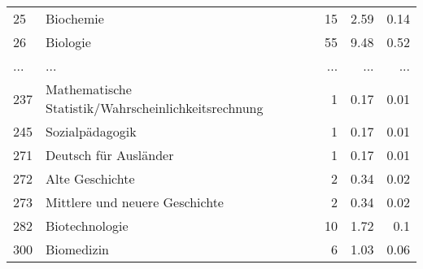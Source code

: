 \begin{longtable}{lXrrr}
        25 & \multicolumn{1}{X}{Biochemie} & %
          \num{15} &
          \num[round-mode=places,round-precision=2]{2.59} &
          \num[round-mode=places,round-precision=2]{0.14} \\
        26 & \multicolumn{1}{X}{Biologie} & %
          \num{55} &
          \num[round-mode=places,round-precision=2]{9.48} &
          \num[round-mode=places,round-precision=2]{0.52} \\
       ... & ... & ... & ... & ... \\
        237 & \multicolumn{1}{X}{Mathematische Statistik/Wahrscheinlichkeitsrechnung} & %
          \num{1} &
          \num[round-mode=places,round-precision=2]{0.17} &
          \num[round-mode=places,round-precision=2]{0.01} \\

        245 & \multicolumn{1}{X}{Sozialpädagogik} & %
          \num{1} &
          \num[round-mode=places,round-precision=2]{0.17} &
          \num[round-mode=places,round-precision=2]{0.01} \\

        271 & \multicolumn{1}{X}{Deutsch für Ausländer} & %
          \num{1} &
          \num[round-mode=places,round-precision=2]{0.17} &
          \num[round-mode=places,round-precision=2]{0.01} \\

        272 & \multicolumn{1}{X}{Alte Geschichte} & %
          \num{2} &
          \num[round-mode=places,round-precision=2]{0.34} &
          \num[round-mode=places,round-precision=2]{0.02} \\

        273 & \multicolumn{1}{X}{Mittlere und neuere Geschichte} & %
          \num{2} &
          \num[round-mode=places,round-precision=2]{0.34} &
          \num[round-mode=places,round-precision=2]{0.02} \\

        282 & \multicolumn{1}{X}{Biotechnologie} & %
          \num{10} &
          \num[round-mode=places,round-precision=2]{1.72} &
          \num[round-mode=places,round-precision=2]{0.1} \\

        300 & \multicolumn{1}{X}{Biomedizin} & %
          \num{6} &
          \num[round-mode=places,round-precision=2]{1.03} &
          \num[round-mode=places,round-precision=2]{0.06} \\


\end{longtable}
